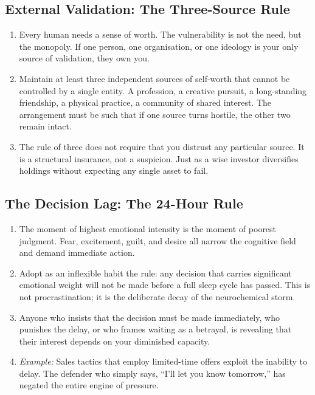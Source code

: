 \documentclass[12pt,a4paper,oneside]{book}
\begin{document}
\subsection{External Validation: The Three-Source Rule}
\begin{enumerate}[leftmargin=*, label=\arabic*.]
\item Every human needs a sense of worth. The vulnerability is not the need, but the monopoly. If one person, one organisation, or one ideology is your only source of validation, they own you.
\item Maintain at least three independent sources of self-worth that cannot be controlled by a single entity. A profession, a creative pursuit, a long-standing friendship, a physical practice, a community of shared interest. The arrangement must be such that if one source turns hostile, the other two remain intact.
\item The rule of three does not require that you distrust any particular source. It is a structural insurance, not a suspicion. Just as a wise investor diversifies holdings without expecting any single asset to fail.
\end{enumerate}

\subsection{The Decision Lag: The 24-Hour Rule}
\begin{enumerate}[leftmargin=*, label=\arabic*.]
\item The moment of highest emotional intensity is the moment of poorest judgment. Fear, excitement, guilt, and desire all narrow the cognitive field and demand immediate action.
\item Adopt as an inflexible habit the rule: any decision that carries significant emotional weight will not be made before a full sleep cycle has passed. This is not procrastination; it is the deliberate decay of the neurochemical storm.
\item Anyone who insists that the decision must be made immediately, who punishes the delay, or who frames waiting as a betrayal, is revealing that their interest depends on your diminished capacity.
\item \textit{Example:} Sales tactics that employ limited-time offers exploit the inability to delay. The defender who simply says, “I'll let you know tomorrow,” has negated the entire engine of pressure.
\end{enumerate}
\end{document}
